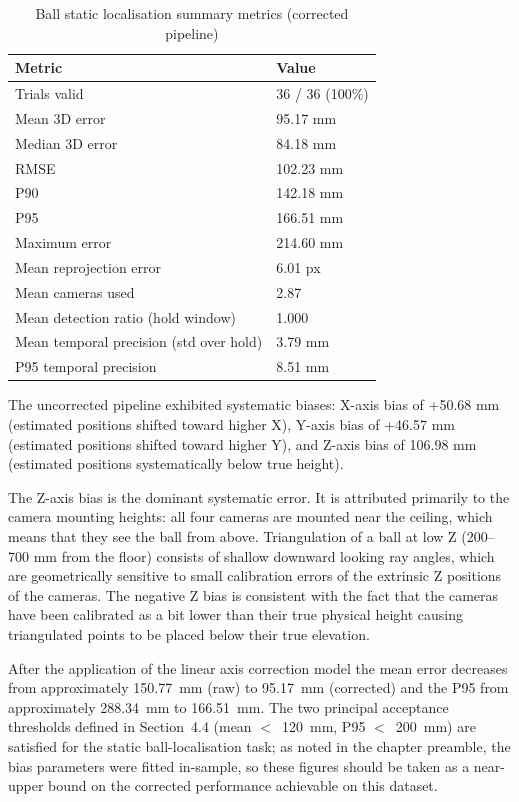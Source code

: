 \begin{table}[htbp]
\centering
\caption{Ball static localisation summary metrics (corrected pipeline)}
\label{tab:5_1}
\begin{tabular}{|l|l|}
\hline
\textbf{Metric} & \textbf{Value} \\
\hline
Trials valid & 36 / 36 (100\%) \\
\hline
Mean 3D error & 95.17 mm \\
\hline
Median 3D error & 84.18 mm \\
\hline
RMSE & 102.23 mm \\
\hline
P90 & 142.18 mm \\
\hline
P95 & 166.51 mm \\
\hline
Maximum error & 214.60 mm \\
\hline
Mean reprojection error & 6.01 px \\
\hline
Mean cameras used & 2.87 \\
\hline
Mean detection ratio (hold window) & 1.000 \\
\hline
Mean temporal precision (std over hold) & 3.79 mm \\
\hline
P95 temporal precision & 8.51 mm \\
\hline
\end{tabular}
\end{table}

The uncorrected pipeline exhibited systematic biases: X-axis bias of +50.68 mm (estimated positions shifted toward higher X), Y-axis bias of +46.57 mm (estimated positions shifted toward higher Y), and Z-axis bias of \textminus{}106.98 mm (estimated positions systematically below true height).

The Z-axis bias is the dominant systematic error. It is attributed primarily to the camera mounting heights: all four cameras are mounted near the ceiling, which means that they see the ball from above. Triangulation of a ball at low Z (200--700 mm from the floor) consists of shallow downward looking ray angles, which are geometrically sensitive to small calibration errors of the extrinsic Z positions of the cameras. The negative Z bias is consistent with the fact that the cameras have been calibrated as a bit lower than their true physical height causing triangulated points to be placed below their true elevation.

After the application of the linear axis correction model the mean error decreases from approximately 150.77~mm (raw) to 95.17~mm (corrected) and the P95 from approximately 288.34~mm to 166.51~mm. The two principal acceptance thresholds defined in Section~4.4 (mean $<$~120~mm, P95 $<$~200~mm) are satisfied for the static ball-localisation task; as noted in the chapter preamble, the bias parameters were fitted in-sample, so these figures should be taken as a near-upper bound on the corrected performance achievable on this dataset.

